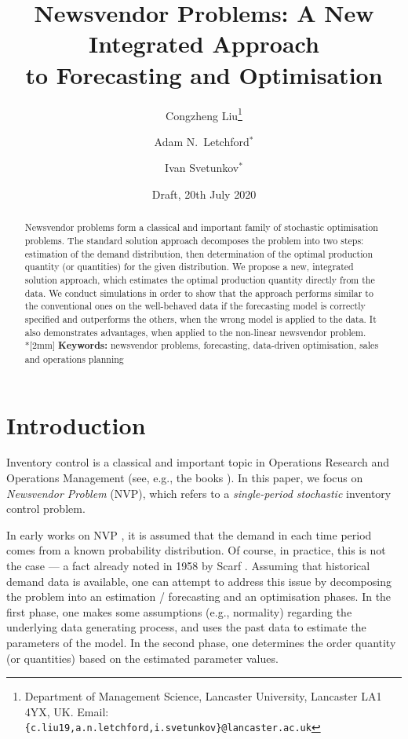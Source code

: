 \documentclass{article}
\title{Newsvendor Problems: A New Integrated Approach\\ to Forecasting and Optimisation}
\author{Congzheng Liu\thanks{Department of Management Science,
Lancaster University, Lancaster LA1 4YX, UK.
Email: {\tt \{c.liu19,a.n.letchford,i.svetunkov\}@lancaster.ac.uk}}
\and Adam N.\ Letchford$^*$ \and Ivan Svetunkov$^*$} %
\date{Draft, 20th July 2020}
\begin{document}
\maketitle

\begin{abstract}
Newsvendor problems form a classical and important family of stochastic optimisation problems. The standard solution approach decomposes the problem into two steps: estimation of the demand distribution, then determination of the optimal production quantity (or quantities) for the given distribution. We propose a new, integrated solution approach, which estimates the optimal production quantity directly from the data. We conduct simulations in order to show that the approach performs similar to the conventional ones on the well-behaved data if the forecasting model is correctly specified and outperforms the others, when the wrong model is applied to the data. It also demonstrates advantages, when applied to the non-linear newsvendor problem.%
\\*[2mm]
{\bf Keywords:} newsvendor problems, forecasting, data-driven optimisation, sales and operations planning
\end{abstract}


\section{Introduction}

Inventory control is a classical and important topic in Operations Research and Operations Management (see, e.g., the books \cite{Po02,SPP98,Zi00}). In this paper, we focus on \emph{Newsvendor Problem} (NVP), which refers to a \emph{single-period} \emph{stochastic} inventory control problem.

In early works on NVP \cite{AHM51,MK51}, it is assumed that the demand in each time period comes from a known probability distribution. Of course, in practice, this is not the case --- a fact already noted in 1958 by Scarf \cite{Sc58}. Assuming that historical demand data is available, one can attempt to address this issue by decomposing the problem into an estimation / forecasting and an optimisation phases.
In the first phase, one makes some assumptions (e.g., normality) regarding the underlying data generating process, and uses the past data to estimate the parameters of the model.
In the second phase, one determines the order quantity (or quantities) based on the estimated parameter values.
\end{document}
